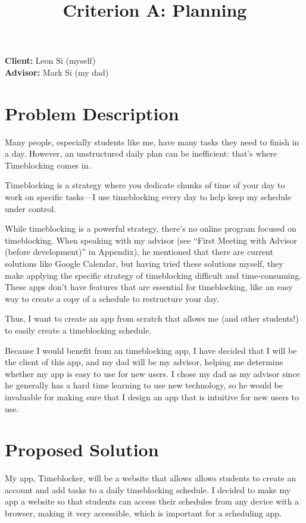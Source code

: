 \documentclass[12pt, notitlepage]{article}
\title{Criterion A: Planning}
\begin{document}
\centerline{\textcolor{msblue}{
		\textbf{\fontsize{13}{13}\MyTitle}
	}}

\noindent\textbf{Client:} Leon Si (myself)
\\
\textbf{Advisor:} Mark Si (my dad)

\section{Problem Description}
Many people, especially students like me, have many tasks they need to finish in a day. However, an unstructured daily plan can be inefficient: that's where Timeblocking comes in.

Timeblocking is a strategy where you dedicate chunks of time of your day to work on specific tasks—I use timeblocking every day to help keep my schedule under control.

While timeblocking is a powerful strategy, there's no online program focused on timeblocking. When speaking with my advisor (see ``First Meeting with Advisor (before development)'' in Appendix), he mentioned that there are current solutions like Google Calendar, but having tried these solutions myself, they make applying the specific strategy of timeblocking difficult and time-consuming. These apps don't have features that are essential for timeblocking, like an easy way to create a copy of a schedule to restructure your day.

Thus, I want to create an app from scratch that allows me (and other students!) to easily create a timeblocking schedule.

Because I would benefit from an timeblocking app, I have decided that I will be the client of this app, and my dad will be my advisor, helping me determine whether my app is easy to use for new users. I chose my dad as my advisor since he generally has a hard time learning to use new technology, so he would be invaluable for making sure that I design an app that is intuitive for new users to use.

\bigskip
{}

\section{Proposed Solution}
My app, Timeblocker, will be a website that allows allows students to create an account and add tasks to a daily timeblocking schedule. I decided to make my app a website so that students can access their schedules from any device with a browser, making it very accessible, which is important for a scheduling app.
\end{document}
